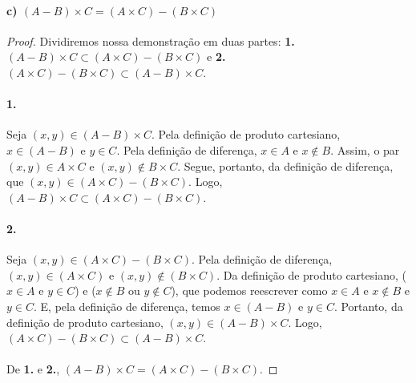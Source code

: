\documentclass[9pt,twocolumn,a4paper]{article}
\begin{document}
    \paragraph{c) $(A - B) \times C = (A \times C) - (B \times C)$}
    \begin{proof} 
    Dividiremos nossa demonstração em duas partes: \textbf{1.} $(A - B) \times C \subset (A \times C) - (B \times C)$ e \textbf{2.} $(A \times C) - (B \times C) \subset (A - B) \times C$.

    \paragraph{1.}
    Seja $(x, y) \in (A - B) \times C$. Pela definição de produto cartesiano, $x \in (A - B)$ e $y \in C$. Pela definição de diferença, $x \in A$ e $x \not\in B$. Assim, o par $(x, y) \in A \times C$ e $(x, y) \not\in B \times C$. Segue, portanto, da definição de diferença, que $(x, y) \in (A \times C) - (B \times C)$. Logo, $(A - B) \times C \subset (A \times C) - (B \times C)$.

    \paragraph{2.}
    Seja $(x, y) \in (A \times C) - (B \times C)$. Pela definição de diferença, $(x, y) \in (A \times C)$ e $(x, y) \not\in (B \times C)$. Da definição de produto cartesiano, ($x \in A$ e $y \in C$) e ($x \not\in B$ ou $y \not\in C$), que podemos reescrever como $x \in A$ e $x \not\in B$ e $y \in C$. E, pela definição de diferença, temos $x \in (A - B)$ e $y \in C$. Portanto, da definição de produto cartesiano, $(x, y) \in (A - B) \times C$. Logo, $(A \times C) - (B \times C) \subset (A - B) \times C$.

    \paragraph{}
    De \textbf{1.} e \textbf{2.}, $(A - B) \times C = (A \times C) - (B \times C)$.
    

    \end{proof}

    
    


    
\end{document}
